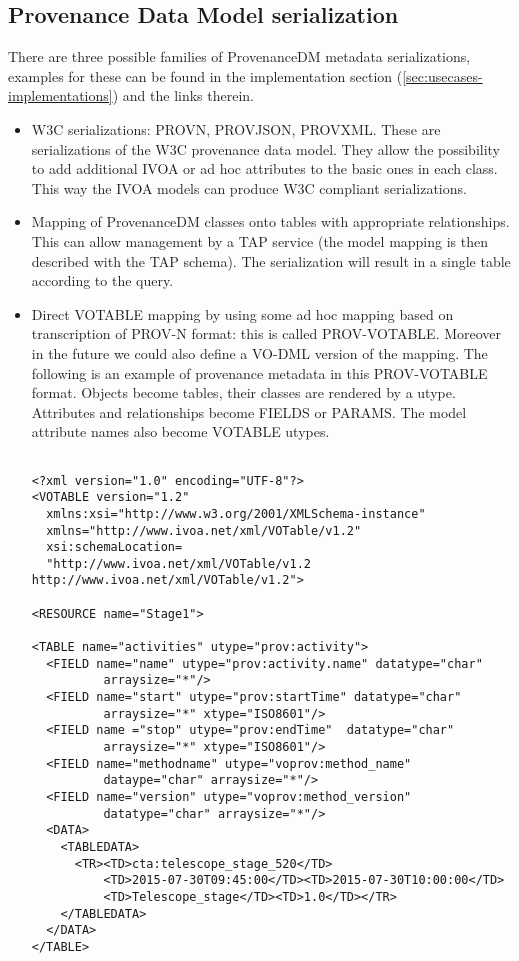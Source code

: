 \subsection{Provenance Data Model serialization}
There are three possible families of ProvenanceDM metadata serializations, examples for these can be found in the implementation section (\ref{sec:usecases-implementations}) and the links therein.
\begin{itemize}
 \item W3C serializations: PROV\-N, PROV\-JSON, PROV\-XML. These are serializations of the W3C provenance data model. They allow the possibility to add additional IVOA or ad hoc attributes to the basic ones in each class. This way the IVOA models can produce W3C compliant serializations.
 \item Mapping of ProvenanceDM classes onto tables with appropriate relationships. This can allow management by a TAP service (the model mapping is then described with the TAP schema). The serialization will result in a single table according to the query.


 \item Direct VOTABLE mapping by using some ad hoc mapping based on transcription of PROV-N format: this is called PROV-VOTABLE. Moreover in the future we could also define a VO-DML \citep{std:VODML} version of the mapping.
The following is an example of provenance metadata in this PROV-VOTABLE format. Objects become tables, their classes are rendered by a utype. Attributes and relationships become FIELDS or PARAMS. The model attribute names also become VOTABLE utypes.  
\begin{verbatim}

<?xml version="1.0" encoding="UTF-8"?>
<VOTABLE version="1.2" 
  xmlns:xsi="http://www.w3.org/2001/XMLSchema-instance"
  xmlns="http://www.ivoa.net/xml/VOTable/v1.2"
  xsi:schemaLocation=
  "http://www.ivoa.net/xml/VOTable/v1.2 http://www.ivoa.net/xml/VOTable/v1.2">

<RESOURCE name="Stage1">

<TABLE name="activities" utype="prov:activity">
  <FIELD name="name" utype="prov:activity.name" datatype="char" 
          arraysize="*"/>
  <FIELD name="start" utype="prov:startTime" datatype="char" 
          arraysize="*" xtype="ISO8601"/>
  <FIELD name ="stop" utype="prov:endTime"  datatype="char" 
          arraysize="*" xtype="ISO8601"/>
  <FIELD name="methodname" utype="voprov:method_name" 
          dataype="char" arraysize="*"/>
  <FIELD name="version" utype="voprov:method_version" 
          datatype="char" arraysize="*"/>  
  <DATA>
    <TABLEDATA>
      <TR><TD>cta:telescope_stage_520</TD>
          <TD>2015-07-30T09:45:00</TD><TD>2015-07-30T10:00:00</TD>
          <TD>Telescope_stage</TD><TD>1.0</TD></TR>
    </TABLEDATA>
  </DATA>      
</TABLE>


\end{verbatim}
\end{itemize}
